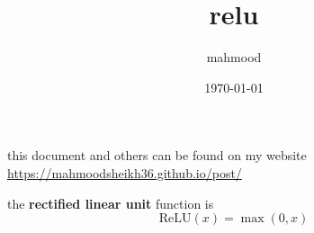 \documentclass[a4paper,12pt]{article}
\author{mahmood}
\date{\today}
\title{relu}
\begin{document}
\maketitle
\begin{note}
this document and others can be found on my website\\
\url{https://mahmoodsheikh36.github.io/post/}
\end{note}
the \textbf{rectified linear unit} function is\\
\[
\mathrm{ReLU}(x) = \max(0,x)
\]
\end{document}

